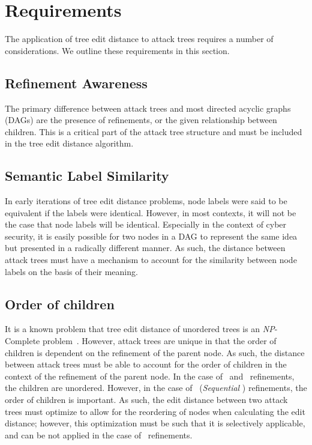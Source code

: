 \section{Requirements}
\label{sec:requirements}

The application of tree edit distance to attack trees requires a number of considerations. We outline these requirements in this section.


\subsection{Refinement Awareness}
\label{ssec:refinement}

The primary difference between attack trees and most directed acyclic graphs (DAGs) are the presence of refinements, or the given relationship between children. This is a critical part of the attack tree structure and must be included in the tree edit distance algorithm.

\subsection{Semantic Label Similarity}
\label{ssec:label-similarity}

In early iterations of tree edit distance problems, node labels were said to be equivalent if the labels were identical. However, in most contexts, it will not be the case that node labels will be identical. Especially in the context of cyber security, it is easily possible for two nodes in a DAG to represent the same idea but presented in a radically different manner. As such, the distance between attack trees must have a mechanism to account for the similarity between node labels on the basis of their meaning.

\subsection{Order of children}
\label{ssec:order-of-children}

It is a known problem that tree edit distance of unordered trees is an \textit{NP}-Complete problem~\cite{zhang_editing_1992}. However, attack trees are unique in that the order of children is dependent on the refinement of the parent node. As such, the distance between attack trees must be able to account for the order of children in the context of the refinement of the parent node. In the case of \AND\ and \OR\ refinements, the children are unordered. However, in the case of \SAND\ (\emph{Sequential} \AND) refinements, the order of children is important. As such, the edit distance between two attack trees must optimize to allow for the reordering of nodes when calculating the edit distance; however, this optimization must be such that it is selectively applicable, and can be not applied in the case of \SAND\ refinements.

